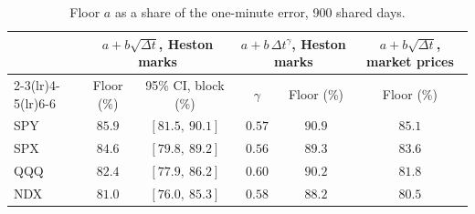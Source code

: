 \begin{table}[tbp]
\centering
\small
\begin{tabular}{lccccc}
\toprule
 & \multicolumn{2}{c}{$a + b\sqrt{\Delta t}$, Heston marks} & \multicolumn{2}{c}{$a + b\,\Delta t^{\gamma}$, Heston marks} & $a + b\sqrt{\Delta t}$, market prices \\
\cmidrule(lr){2-3}\cmidrule(lr){4-5}\cmidrule(lr){6-6}
 & Floor (\%) & 95\% CI, block (\%) & $\gamma$ & Floor (\%) & Floor (\%) \\
\midrule
SPY & $85.9$ & $[81.5,\ 90.1]$ & $0.57$ & $90.9$ & $85.1$ \\
SPX & $84.6$ & $[79.8,\ 89.2]$ & $0.56$ & $89.3$ & $83.6$ \\
QQQ & $82.4$ & $[77.9,\ 86.2]$ & $0.60$ & $90.2$ & $81.8$ \\
NDX & $81.0$ & $[76.0,\ 85.3]$ & $0.58$ & $88.2$ & $80.5$ \\
\bottomrule
\end{tabular}
\caption{Floor $a$ as a share of the one-minute error, 900 shared days.}
\label{tab:floorrobust}
\end{table}
